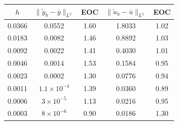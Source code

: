 {\begin{minipage}{0.5\textwidth}
\begin{tikzpicture}[scale=0.4]
\end{tikzpicture} 
\captionsetup{font=footnotesize}
\label{fig:error q05}
\end{minipage}
\hspace{-3mm}
\begin{minipage}{0.5\textwidth}
\footnotesize
\centering
\begin{tabular}{ccccc}
\hline
$h$ &$\|\tilde y_h -\bar y\|_{L^2}$ & EOC & $\|\tilde u_h -\bar u\|_{L^2}$ & EOC \\
\hline\hline
0.0366 & 0.0552 & 1.60 & 1.8033 & 1.02 \\\hline
0.0183 & 0.0082 & 1.46   & 0.8892 & 1.03 \\\hline
0.0092 & 0.0022 & 1.41   & 0.4030 &1.01 \\\hline
0.0046 & 0.0014 & 1.53   & 0.1584 & 0.95 \\\hline
0.0023 & 0.0002 & 1.30  & 0.0776&0.94 \\\hline
0.0011 & $1.1\times 10^{-4}$ & 1.39& 0.0360& 0.89 \\\hline
0.0006 & $3\times 10^{-5}$& 1.13&0.0216& 0.95 \\\hline
0.0003 & $8\times 10^{-6}$& 0.90 &0.0186 & 1.30
\end{tabular}
\captionsetup{font=footnotesize}
\label{tab:q05}
\end{minipage}

}
